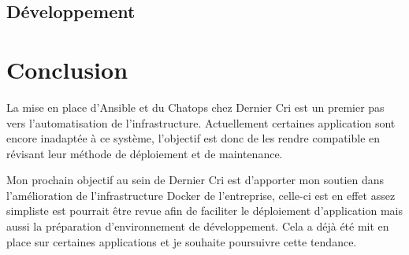 \subsection{Développement}\label{duxe9veloppement}

\newpage

\section{Conclusion}\label{conclusion}

La mise en place d'Ansible et du Chatops chez Dernier Cri est un premier
pas vers l'automatisation de l'infrastructure. Actuellement certaines
application sont encore inadaptée à ce système, l'objectif est donc de
les rendre compatible en révisant leur méthode de déploiement et de
maintenance.

\bigskip

Mon prochain objectif au sein de Dernier Cri est d'apporter mon soutien
dans l'amélioration de l'infrastructure Docker de l'entreprise, celle-ci
est en effet assez simpliste est pourrait être revue afin de faciliter
le déploiement d'application mais aussi la préparation d'environnement
de développement. Cela a déjà été mit en place sur certaines
applications et je souhaite poursuivre cette tendance.
